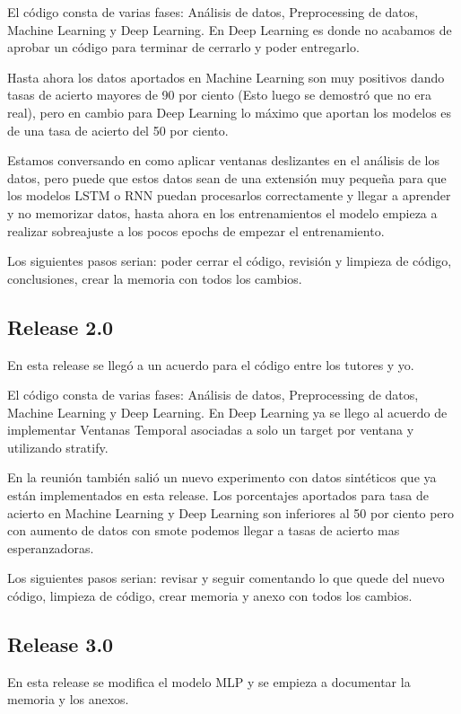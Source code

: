 El código consta de varias fases: Análisis de datos, Preprocessing de datos, Machine Learning y Deep Learning.
En Deep Learning es donde no acabamos de aprobar un código para terminar de cerrarlo y poder entregarlo.

Hasta ahora los datos aportados en Machine Learning son muy positivos dando tasas de acierto mayores de 90 por ciento (Esto luego se demostró que no era real), pero en cambio para Deep Learning lo máximo que aportan los modelos es de una tasa de acierto del 50 por ciento.

Estamos conversando en como aplicar ventanas deslizantes en el análisis de los datos, pero puede que estos datos sean de una extensión muy pequeña para que los modelos LSTM o RNN puedan procesarlos correctamente y llegar a aprender y no memorizar datos, hasta ahora en los entrenamientos el modelo empieza a realizar sobreajuste a los pocos epochs de empezar el entrenamiento.

Los siguientes pasos serian: poder cerrar el código, revisión y limpieza de código, conclusiones, crear la memoria con todos los cambios.

\subsection{Release 2.0}

En esta release se llegó a un acuerdo para el código entre los tutores y yo.

El código consta de varias fases: Análisis de datos, Preprocessing de datos, Machine Learning y Deep Learning.
En Deep Learning ya se llego al acuerdo de implementar Ventanas Temporal asociadas a solo un target por ventana y utilizando stratify.

En la reunión también salió un nuevo experimento con datos sintéticos que ya están implementados en esta release.
Los porcentajes aportados para tasa de acierto en Machine Learning y Deep Learning son inferiores al 50 por ciento pero con aumento de datos con smote podemos llegar a tasas de acierto mas esperanzadoras.

Los siguientes pasos serian: revisar y seguir comentando lo que quede del nuevo código, limpieza de código, crear memoria y anexo con todos los cambios.

\subsection{Release 3.0}

En esta release se modifica el modelo MLP y se empieza a documentar la memoria y los anexos.

